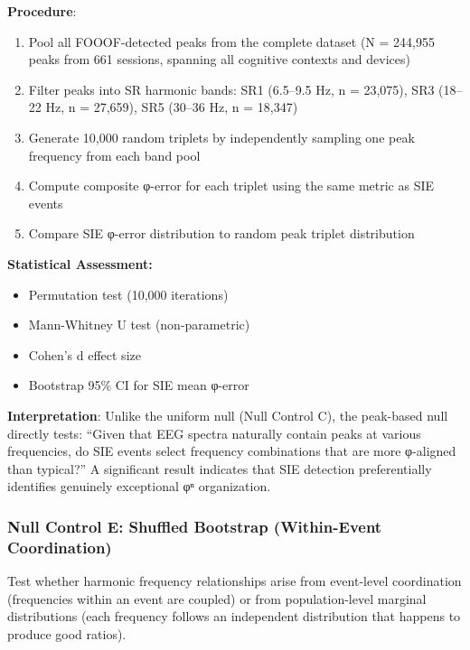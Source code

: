 \documentclass[11pt,a4paper]{article}
\begin{document}
\textbf{Procedure}:
\begin{enumerate}
\item Pool all FOOOF-detected peaks from the complete dataset (N = 244,955 peaks from 661 sessions, spanning all cognitive contexts and devices)
\item Filter peaks into SR harmonic bands: SR1 (6.5–9.5 Hz, n = 23,075), SR3 (18–22 Hz, n = 27,659), SR5 (30–36 Hz, n = 18,347)
\item Generate 10,000 random triplets by independently sampling one peak frequency from each band pool
\item Compute composite φ-error for each triplet using the same metric as SIE events
\item Compare SIE φ-error distribution to random peak triplet distribution
\end{enumerate}

\textbf{Statistical Assessment:}
\begin{itemize}
\item Permutation test (10,000 iterations)
\item Mann-Whitney U test (non-parametric)
\item Cohen's d effect size
\item Bootstrap 95\% CI for SIE mean φ-error
\end{itemize}

\textbf{Interpretation}: Unlike the uniform null (Null Control C), the peak-based null directly tests: ``Given that EEG spectra naturally contain peaks at various frequencies, do SIE events select frequency combinations that are more φ-aligned than typical?'' A significant result indicates that SIE detection preferentially identifies genuinely exceptional φⁿ organization.

\subsubsection{Null Control E: Shuffled Bootstrap (Within-Event Coordination)}
Test whether harmonic frequency relationships arise from event-level coordination (frequencies within an event are coupled) or from population-level marginal distributions (each frequency follows an independent distribution that happens to produce good ratios).
\end{document}
